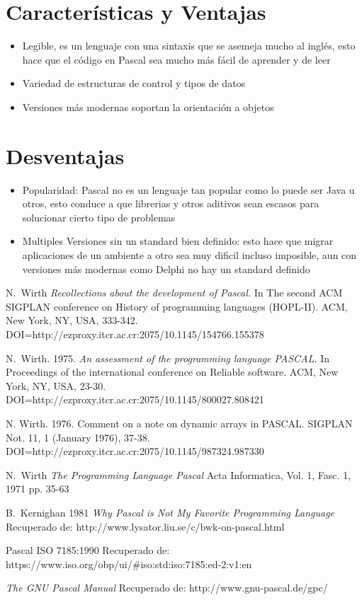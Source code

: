 \documentclass[10pt,journal,compsoc]{IEEEtran}
\begin{document}
\section{Caracter\'isticas y Ventajas}
\begin{itemize}
	\item Legible, es un lenguaje con una sintaxis que se asemeja mucho al ingl\'es, esto hace que el c\'odigo en Pascal sea mucho m\'as f\'acil de aprender y de leer
	\item Variedad de estructuras de control y tipos de datos
	\item Versiones m\'as modernas soportan la orientaci\'on a objetos
\end{itemize}


\section{Desventajas}
\begin{itemize}
	\item Popularidad: Pascal no es un lenguaje tan popular como lo puede ser Java u otros, esto conduce a que librerias y otros aditivos sean escasos para solucionar cierto tipo de problemas
	\item Multiples Versiones sin un standard bien definido: esto hace que migrar aplicaciones de un ambiente a otro sea muy dificil incluso imposible, aun con versiones m\'as modernas como Delphi no hay un standard definido
\end{itemize}

\begin{thebibliography}{3}
	
	N.~Wirth \emph{Recollections about the development of Pascal.} In The second ACM SIGPLAN conference on History of programming languages (HOPL-II). ACM, New York, NY, USA, 333-342. DOI=http://ezproxy.itcr.ac.cr:2075/10.1145/154766.155378
	
	N.~Wirth. 1975. \emph{An assessment of the programming language PASCAL.} In Proceedings of the international conference on Reliable software. ACM, New York, NY, USA, 23-30. DOI=http://ezproxy.itcr.ac.cr:2075/10.1145/800027.808421
	
	N. Wirth. 1976. Comment on a note on dynamic arrays in PASCAL. SIGPLAN Not. 11, 1 (January 1976), 37-38. DOI=http://ezproxy.itcr.ac.cr:2075/10.1145/987324.987330
	
	N.~Wirth \emph{The Programming Language Pascal} Acta Informatica, Vol. 1, Fasc. 1, 1971 pp. 35-63
	
	B.~Kernighan 1981 \emph{Why Pascal is Not My Favorite Programming Language} Recuperado de:
	http://www.lysator.liu.se/c/bwk-on-pascal.html
	
	Pascal ISO 7185:1990 Recuperado de: https://www.iso.org/obp/ui/\#iso:std:iso:7185:ed-2:v1:en
	
	\emph{The GNU Pascal Manual} Recuperado de: http://www.gnu-pascal.de/gpc/
	
\end{thebibliography}
\end{document}
